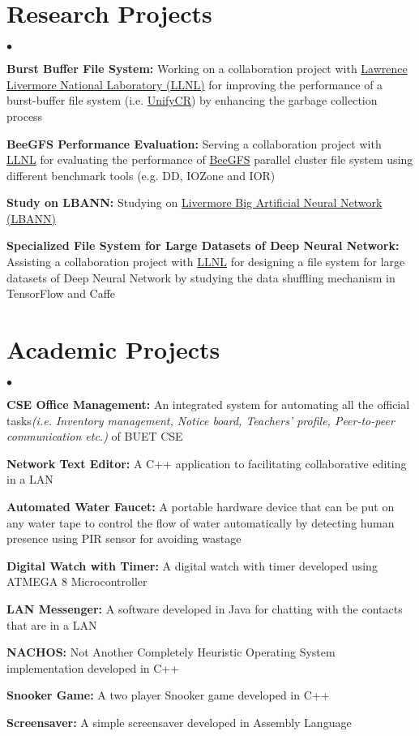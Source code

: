 \documentclass[margin,line]{res}
\newenvironment{list2}{
  \begin{list}{$\bullet$}{%
      \setlength{\itemsep}{0in}
      \setlength{\parsep}{0in} \setlength{\parskip}{0in}
      \setlength{\topsep}{0in} \setlength{\partopsep}{0in} 
      \setlength{\leftmargin}{0.2in}}}{\end{list}}
\begin{document}
\begin{resume}
\section{\sc Research Projects}
\begin{list2}
\item {\bf Burst Buffer File System:} Working on a collaboration project with \href{https://www.llnl.gov/}{Lawrence Livermore National Laboratory (LLNL)} for improving the performance of a burst-buffer file system (i.e. \href{https://github.com/LLNL/UnifyCR}{UnifyCR}) by enhancing the garbage collection process
\item {\bf BeeGFS Performance Evaluation:} Serving a collaboration project with \href{https://www.llnl.gov/}{LLNL} for evaluating the performance of \href{https://www.beegfs.io/content/}{BeeGFS} parallel cluster file system using different benchmark tools (e.g. DD, IOZone and IOR)
\item {\bf Study on LBANN:} Studying on \href{https://github.com/LLNL/lbann}{Livermore Big Artificial Neural Network (LBANN)}
\item {\bf Specialized File System for Large Datasets of Deep Neural Network:} Assisting a collaboration project with \href{https://www.llnl.gov/}{LLNL} for designing a file system for large datasets of Deep Neural Network by studying the data shuffling mechanism in TensorFlow and Caffe
\end{list2}

\vspace*{-.1in}

\section{\sc Academic Projects}
\begin{list2}
\item {\bf CSE Office Management:} An integrated system for automating all the official tasks\textit{(i.e. Inventory management, Notice board, Teachers' profile, Peer-to-peer communication etc.)} of BUET CSE
\item {\bf Network Text Editor:} A C++ application to facilitating collaborative editing in a LAN
\item {\bf Automated Water Faucet:} A portable hardware device that can be put on any water tape to control the flow of water automatically by detecting human presence using PIR sensor for avoiding wastage
\item {\bf Digital Watch with Timer:} A digital watch with timer developed using ATMEGA 8 Microcontroller
\item {\bf LAN Messenger:} A software developed in Java for chatting with the contacts that are in a LAN
\item {\bf NACHOS:} Not Another Completely Heuristic Operating System implementation developed in C++
\item {\bf Snooker Game:} A two player Snooker game developed in C++
\item {\bf Screensaver:} A simple screensaver developed in Assembly Language
\end{list2}


\end{resume}
\end{document}
